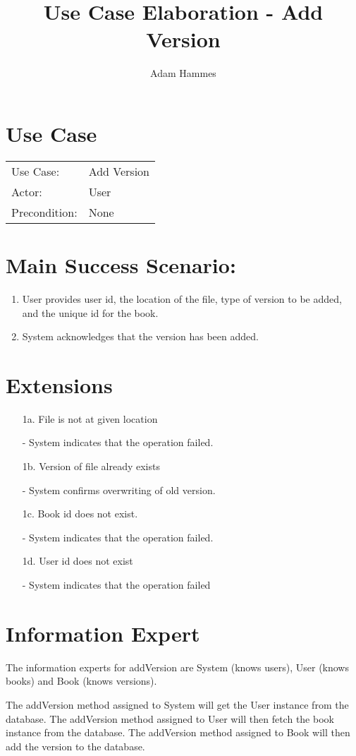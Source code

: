 \documentclass{article}
\title{Use Case Elaboration - Add Version}
\author{Adam Hammes}
\begin{document}
\maketitle

\section*{Use Case}

\begin{tabular}{l l}
  Use Case:     & Add Version \\
  Actor:        & User        \\
  Precondition: & None        \\
\end{tabular}

\section*{Main Success Scenario:}

\begin{enumerate}
  \item User provides user id, the location of the file, type of version
    to be added, and the unique id for the book.
  \item System acknowledges that the version has been added.
\end{enumerate}

\section*{Extensions}

\begin{enumerate}
  \item [1a.] File is not at given location

    - System indicates that the operation failed.

  \item [1b.] Version of file already exists

    - System confirms overwriting of old version.

  \item [1c.] Book id does not exist.

    - System indicates that the operation failed.
    
  \item [1d.] User id does not exist
  
    - System indicates that the operation failed
\end{enumerate}
\section*{Information Expert}

The information experts for addVersion are System (knows users), User (knows
books) and Book (knows versions).

The addVersion method assigned to System will get the User instance from the
database. The addVersion method assigned to User will then fetch the book
instance from the database. The addVersion method assigned to Book will then add
the version to the database.
\end{document}
